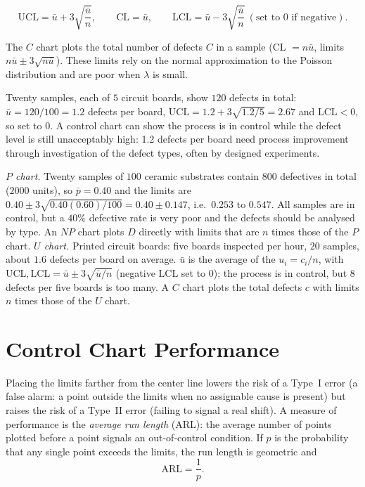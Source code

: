 \begin{theorem}[$U$ chart]\label{thm:uchart}
\[ \mathrm{UCL}=\bar{u}+3\sqrt{\frac{\bar{u}}n},\qquad\mathrm{CL}=\bar{u},\qquad\mathrm{LCL}=\bar{u}-3\sqrt{\frac{\bar{u}}n}\ (\text{set to }0\text{ if negative}). \]
\end{theorem}

The $C$ chart plots the total number of defects $C$ in a sample (CL $=n\bar{u}$, limits $n\bar{u}\pm3\sqrt{n\bar{u}}$). These limits rely on the normal approximation to the Poisson distribution and are poor when $\lambda$ is small.

\begin{example}
Twenty samples, each of $5$ circuit boards, show $120$ defects in total: $\bar{u}=120/100=1.2$ defects per board, $\mathrm{UCL}=1.2+3\sqrt{1.2/5}=2.67$ and $\mathrm{LCL}<0$, so set to $0$. A control chart can show the process is in control while the defect level is still unacceptably high: 1.2 defects per board need process improvement through investigation of the defect types, often by designed experiments.
\end{example}

\begin{example}
\emph{$P$ chart.} Twenty samples of $100$ ceramic substrates contain $800$ defectives in total ($2000$ units), so $\bar{p}=0.40$ and the limits are $0.40\pm3\sqrt{0.40(0.60)/100}=0.40\pm0.147$, i.e.\ $0.253$ to $0.547$. All samples are in control, but a $40\%$ defective rate is very poor and the defects should be analysed by type. An $NP$ chart plots $D$ directly with limits that are $n$ times those of the $P$ chart.
\emph{$U$ chart.} Printed circuit boards: five boards inspected per hour, $20$ samples, about $1.6$ defects per board on average. $\bar{u}$ is the average of the $u_i=c_i/n$, with $\mathrm{UCL},\mathrm{LCL}=\bar{u}\pm3\sqrt{\bar{u}/n}$ (negative $\mathrm{LCL}$ set to $0$); the process is in control, but $8$ defects per five boards is too many. A $C$ chart plots the total defects $c$ with limits $n$ times those of the $U$ chart.
\end{example}

\section{Control Chart Performance}

Placing the limits farther from the center line lowers the risk of a Type~I error (a false alarm: a point outside the limits when no assignable cause is present) but raises the risk of a Type~II error (failing to signal a real shift). A measure of performance is the \emph{average run length} (ARL): the average number of points plotted before a point signals an out-of-control condition. If $p$ is the probability that any single point exceeds the limits, the run length is geometric and
\[ \mathrm{ARL}=\frac1p. \]

